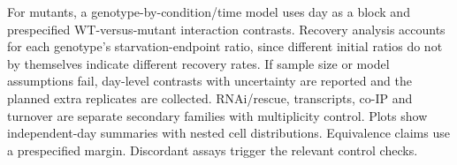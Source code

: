 For mutants, a genotype-by-condition/time model uses day as a block and prespecified WT-versus-mutant interaction contrasts. Recovery analysis accounts for each genotype's starvation-endpoint ratio, since different initial ratios do not by themselves indicate different recovery rates. If sample size or model assumptions fail, day-level contrasts with uncertainty are reported and the planned extra replicates are collected. RNAi/rescue, transcripts, co-IP and turnover are separate secondary families with multiplicity control. Plots show independent-day summaries with nested cell distributions. Equivalence claims use a prespecified margin. Discordant assays trigger the relevant control checks.
